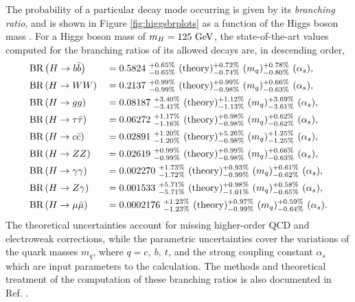 The probability of a particular decay mode occurring is given by its \textit{branching ratio}, and is shown in Figure \ref{fig:higgsbrplots} as a function of the Higgs boson mass \massH. For a Higgs boson mass of $m_{H} = 125\ \mathrm{GeV}$, the state-of-the-art values computed for the branching ratios of its allowed decays are, in descending order,
\begin{alignat*}{2}
  &\textrm{BR}\left( H \rightarrow b\bar{b} \right) &&= 0.5824\ {}_{-0.65\%}^{+0.65\%}\ (\mathrm{theory}) {}_{-0.74\%}^{+0.72\%}\ (m_{q}) {}_{-0.80\%}^{+0.78\%}\ (\alpha_{s}), \\
  &\textrm{BR}\left( H \rightarrow WW \right) &&= 0.2137\ {}_{-0.99\%}^{+0.99\%}\ (\mathrm{theory}) {}_{-0.98\%}^{+0.99\%}\ (m_{q}) {}_{-0.63\%}^{+0.66\%}\ (\alpha_{s}), \\
  &\textrm{BR}\left( H \rightarrow gg \right) &&= 0.08187\ {}_{-3.41\%}^{+3.40\%}\ (\mathrm{theory}) {}_{-1.13\%}^{+1.12\%}\ (m_{q}) {}_{-3.61\%}^{+3.69\%}\ (\alpha_{s}), \\
  &\textrm{BR}\left( H \rightarrow \tau\bar{\tau} \right) &&= 0.06272\ {}_{-1.16\%}^{+1.17\%}\ (\mathrm{theory}) {}_{-0.98\%}^{+0.98\%}\ (m_{q}) {}_{-0.62\%}^{+0.62\%}\ (\alpha_{s}), \\
  &\textrm{BR}\left( H \rightarrow c\bar{c} \right) &&= 0.02891\ {}_{-1.20\%}^{+1.20\%}\ (\mathrm{theory}) {}_{-0.98\%}^{+5.26\%}\ (m_{q}) {}_{-1.25\%}^{+1.25\%}\ (\alpha_{s}), \\
  &\textrm{BR}\left( H \rightarrow ZZ \right) &&= 0.02619\ {}_{-0.99\%}^{+0.99\%}\ (\mathrm{theory}) {}_{-0.98\%}^{+0.99\%}\ (m_{q}) {}_{-0.63\%}^{+0.66\%}\ (\alpha_{s}), \\
  &\textrm{BR}\left( H \rightarrow \gamma\gamma \right) &&= 0.002270\ {}_{-1.72\%}^{+1.73\%}\ (\mathrm{theory}) {}_{-0.99\%}^{+0.93\%}\ (m_{q}) {}_{-0.62\%}^{+0.61\%}\ (\alpha_{s}), \\
  &\textrm{BR}\left( H \rightarrow Z\gamma \right) &&= 0.001533\ {}_{-5.71\%}^{+5.71\%}\ (\mathrm{theory}) {}_{-1.01\%}^{+0.98\%}\ (m_{q}) {}_{-0.65\%}^{+0.58\%}\ (\alpha_{s}), \\
  &\textrm{BR}\left( H \rightarrow \mu\bar{\mu} \right) &&= 0.0002176\ {}_{-1.23\%}^{+1.23\%}\ (\mathrm{theory}) {}_{-0.99\%}^{+0.97\%}\ (m_{q}) {}_{-0.64\%}^{+0.59\%}\ (\alpha_{s}).
\end{alignat*}
The theoretical uncertainties account for missing higher-order QCD and electroweak corrections, while the parametric uncertainties cover the variations of the quark masses $m_{q}$, where $q = c,\ b,\ t$, and the strong coupling constant $\alpha_{s}$ which are input parameters to the calculation. The methods and theoretical treatment of the computation of these branching ratios is also documented in Ref. \cite{CERNYR4}.

